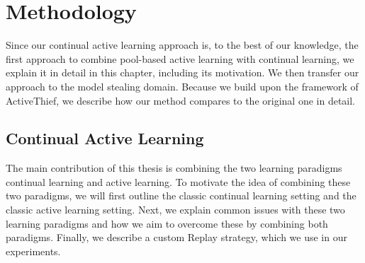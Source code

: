 
\chapter{Methodology}
\label{ch:Methodolody}

Since our continual active learning approach is, to the best of our knowledge, the first approach to combine pool-based active learning with continual
learning, we explain it in detail in this chapter, including its motivation. We then transfer our approach to the model stealing domain. Because we
build upon the framework of ActiveThief, we describe how our method compares to the original one in detail.

\section{Continual Active Learning}
\label{sec:Methodology:ContinualActiveLearning}
The main contribution of this thesis is combining the two learning paradigms continual learning and active learning. To motivate the idea of combining
these two paradigms, we will first outline the classic continual learning setting and the classic active learning setting.
Next, we explain common issues with these two learning paradigms and how we aim to overcome these by combining both paradigms. Finally, we describe a custom
Replay strategy, which we use in our experiments.

